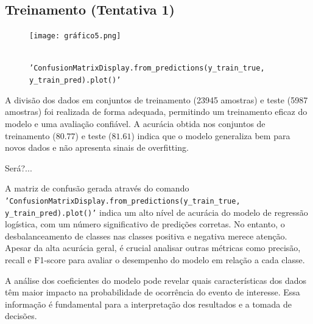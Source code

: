 \documentclass{abntpuc}
\begin{document}
\subsection*{\centering\Large\textbf{Treinamento (Tentativa 1)}}

\begin{figure}[H]
    \centering
    \texttt{[image: gráfico5.png]}
    \caption{\\ \texttt{'ConfusionMatrixDisplay.from\_predictions(y\_train\_true, y\_train\_pred).plot()'}}
    \label{fig:grafico5}
\end{figure}

A divisão dos dados em conjuntos de treinamento (23945 amostras) e teste (5987 amostras) foi realizada de forma adequada, permitindo um treinamento eficaz do modelo e uma avaliação confiável. A acurácia obtida nos conjuntos de treinamento ($ 80.77 $) e teste ($ 81.61 $) indica que o modelo generaliza bem para novos dados e não apresenta sinais de overfitting.

Será?...

A matriz de confusão gerada através do comando \texttt{'ConfusionMatrixDisplay.from\_predictions(y\_train\_true, y\_train\_pred).plot()'} indica um alto nível de acurácia do modelo de regressão logística, com um número significativo de predições corretas. No entanto, o desbalanceamento de classes nas classes positiva e negativa merece atenção. Apesar da alta acurácia geral, é crucial analisar outras métricas como precisão, recall e F1-score para avaliar o desempenho do modelo em relação a cada classe.

A análise dos coeficientes do modelo pode revelar quais características dos dados têm maior impacto na probabilidade de ocorrência do evento de interesse. Essa informação é fundamental para a interpretação dos resultados e a tomada de decisões.
\end{document}
